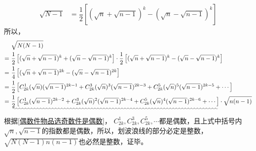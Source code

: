 \begin{enumerate}[label={【\textbf{例\thechapter.\arabic*}】},
 leftmargin=\inteval{\myenumleftmargin}pt,
 itemsep=\inteval{\myenumitempsep}pt,
 itemindent=\inteval{\myenumitemindent}pt]
\begin{align*}
    \sqrt{N-1} &=\dfrac{1}{2}\left[(\sqrt{n}+\sqrt{n-1})^k
    -(\sqrt{n}-\sqrt{n-1})^k\right] 
\end{align*}
所以，
{\small \begin{align*}
        &\ \sqrt{N(N-1)}\\
        =&\ \dfrac{1}{2}\left[(\sqrt{n}+\sqrt{n-1})^k
        +(\sqrt{n}-\sqrt{n-1})^k\right]\cdot
        \dfrac{1}{2}\left[(\sqrt{n}+\sqrt{n-1})^k
        -(\sqrt{n}-\sqrt{n-1})^k\right] \\
        =&\ \dfrac{1}{4}\left[(\sqrt{n}+\sqrt{n-1})^{2k}-
        (\sqrt{n}-\sqrt{n-1})^{2k}\right] \\  
        =&\ \dfrac{1}{2}\left[C_{2k}^1(\sqrt{n})(\sqrt{n-1})^{2k-1}
        +C_{2k}^3(\sqrt{n})^3(\sqrt{n-1})^{2k-3}+
        C_{2k}^5(\sqrt{n})^5(\sqrt{n-1})^{2k-5}+\cdots\right] \\
        =&\ \uwave{\dfrac{1}{2}\left[C_{2k}^1(\sqrt{n-1})^{2k-2}
            +C_{2k}^3(\sqrt{n})^2(\sqrt{n-1})^{2k-4}+
            C_{2k}^5(\sqrt{n})^4(\sqrt{n-1})^{2k-6}+\cdots\right]}
        \cdot\sqrt{n(n-1)}
\end{align*} }
根据\ref{偶数件物品选奇数件是偶数}，
$ C_{2k}^1,C_{2k}^3,C_{2k}^5,\cdots $都是偶数，且上式中括号内
$ \sqrt{n},\sqrt{n-1} $的指数都是偶数，所以，划波浪线的部分必定是整数，
$ \sqrt{N(N-1)n(n-1)} $也必然是整数，证毕。


\end{enumerate}
